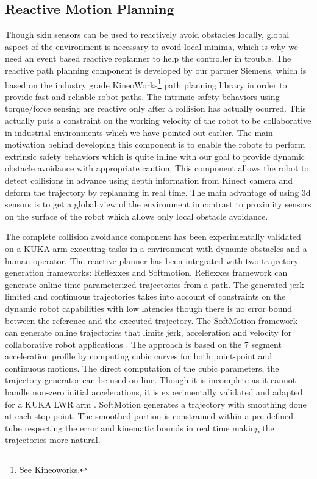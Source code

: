 \subsection{Reactive Motion Planning}
\label{subsec:react_path}
\hypersetup{colorlinks, linkcolor=blue}
Though skin sensors can be used to reactively avoid obstacles locally, global aspect of the environment is necessary to avoid local minima, which is why we need an event based reactive replanner to help the controller in trouble. The reactive path planning component is developed by our partner Siemens, which is based on the industry grade KineoWorks\texttrademark\footnote{See
\href{http://www.plm.automation.siemens.com/en\_us/products/open/kineo/kineoworks/index.shtml}{Kineoworks}.} path planning library in order to provide fast and reliable robot paths. The intrinsic safety behaviors using torque/force sensing are reactive only after a collision has actually ocurred. This actually puts a constraint on the working velocity of the robot to be collaborative in industrial environments which we have pointed out earlier. The main motivation behind developing this component is to enable the robots to perform extrinsic safety behaviors which is quite inline with our goal to provide dynamic obstacle avoidance with appropriate caution. This component allows the robot to detect collisions in advance using depth information from Kinect camera and deform the trajectory by replanning in real time. The main advantage of using 3d sensors is to get a global view of the environment in contrast to proximity sensors on the surface of the robot which allows only local obstacle avoidance.

The complete collision avoidance component has been experimentally validated on a KUKA arm executing tasks in a environment with dynamic obstacles and a human operator. The reactive planner has been integrated with two trajectory generation frameworks: Reflexxes and Softmotion. Reflexxes \cite{kroger2011opening} framework can generate online time parameterized trajectories from a path. The generated jerk-limited and continuous trajectories takes into account of constraints on the dynamic robot capabilities with low latencies though there is no error bound between the reference and the executed trajectory.  The SoftMotion framework can generate online trajectories that limits jerk, acceleration and velocity for collaborative robot applications \cite{broquere2008soft,broquere2010motion}. The approach is based on the 7 segment acceleration profile by computing cubic curves for both point-point and continuous motions. The direct computation of the cubic parameters, the trajectory generator can be used on-line. Though it is incomplete as it cannot handle non-zero initial accelerations, it is experimentally validated and adapted for a KUKA LWR arm \cite{zhao2014online}. SoftMotion generates a trajectory with smoothing done at each stop point. The smoothed portion is constrained within a pre-defined tube respecting the error and kinematic bounds in real time making the trajectories more natural.



